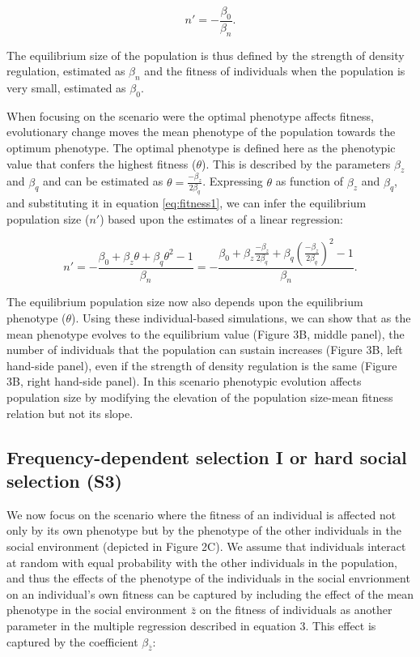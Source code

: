 \documentclass{article}
\begin{document}
\begin{equation}\label{eq:equilibrium}
n'=-\frac{\beta_{0}}{\beta_n}. 
\end{equation} 

The equilibrium size of the population is thus defined by the strength of density regulation, estimated as $\beta_n$ and the fitness of individuals when the population is very small, estimated as $\beta_0$. 

When focusing on the scenario were the optimal phenotype affects fitness, evolutionary change moves the mean phenotype of the population towards the optimum phenotype. The optimal phenotype is defined here as the phenotypic value that confers the highest fitness ($\theta$). This is described by the parameters $\beta_{z}$ and $\beta_{q}$ and can be estimated as $\theta=\frac{-\beta_{z}}{2\beta_{q}}$. Expressing $\theta$ as function of $\beta_{z}$ and $\beta_{q}$, and substituting it in equation \ref{eq:fitness1}, we can infer the equilibrium population size ($n'$) based upon the estimates of a linear regression:

\begin{equation}\label{eq:equilibrium1}
n'=-\frac{\beta_{0}+ \beta_{z}\theta + \beta_{q}\theta^2-1}{\beta_n} = -\frac{\beta_{0}+ \beta_{z}\frac{-\beta_{z}}{2\beta_{q}} + \beta_{q}(\frac{-\beta_{z}}{2\beta_{q}})^2-1}{\beta_n}. 
\end{equation}

 The equilibrium population size now also depends upon the equilibrium phenotype ($\theta$). Using these individual-based simulations, we can show that as the mean phenotype evolves to the equilibrium value (Figure 3B, middle panel), the number of individuals that the population can sustain increases (Figure 3B, left hand-side panel), even if the strength of density regulation is the same (Figure 3B, right hand-side panel). In this scenario phenotypic evolution affects population size by modifying the elevation of the population size-mean fitness relation but not its slope.

\subsection{Frequency-dependent selection I or hard social selection (S3)}

We now focus on the scenario where the fitness of an individual is affected not only by its own phenotype but by the phenotype of the other individuals in the social environment (depicted in Figure 2C). We assume that individuals interact at random with equal probability with the other individuals in the population, and thus the effects of the phenotype of the individuals in the social envrionment on an individual's own fitness can be captured by including the effect of the mean phenotype in the social environment $\bar{z}$ on the fitness of individuals as another parameter in the multiple regression described in equation 3. This effect is captured by the coefficient $\beta_{\bar{z}}$:  
\end{document}
